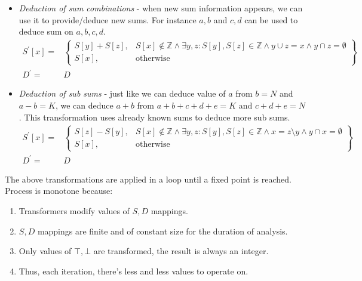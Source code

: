 \begin{itemize}
\item \textit{Deduction of sum combinations} - when new sum information appears, we can use it to provide/deduce new sums. For instance ${a,b}$ and ${c,d}$ can be used to deduce sum on ${a,b,c,d}$.
\begin{align*}
S^\prime[x] = & \left.
	\begin{cases}
		S[y] + S[z], & S[x] \notin \mathbb{Z} \land \exists y,z: S[y],S[z]\in \mathbb{Z}\land y\cup z = x \land y \cap z = \emptyset \\
		S[x], & \text{otherwise}
	\end{cases}
\right\}\\
D^\prime= & D
\end{align*}
\item \textit{Deduction of sub sums} - just like we can deduce value of $a$ from $b=N$ and $a-b=K$, we can deduce $a+b$ from $a+b+c+d+e=K$ and $c+d+e=N$. This transformation uses already known sums to deduce more sub sums.
\begin{align*}
S^\prime[x] = & \left.
	\begin{cases}
		S[z]- S[y], & S[x] \notin \mathbb{Z} \land \exists y,z: S[y],S[z]\in \mathbb{Z}\land x = z \setminus y \land y \cap x = \emptyset \\
		S[x], & \text{otherwise}
	\end{cases}
\right\}\\
D^\prime= & D
\end{align*}
\end{itemize}

The above transformations are applied in a loop until a fixed point is reached. Process is monotone because:
\begin{enumerate}
\item Transformers modify values of $S,D$ mappings.
\item $S,D$ mappings are finite and of constant size for the duration of analysis.
\item Only values of $\top,\bot$ are transformed, the result is always an integer.
\item Thus, each iteration, there's less and less values to operate on.
\end{enumerate}